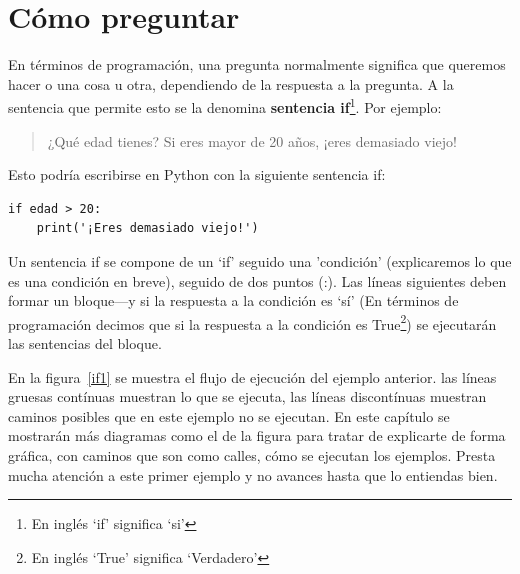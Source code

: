 

\chapter{Cómo preguntar}\label{ch:howtoaskaquestion}

En términos de programación, una pregunta normalmente significa que queremos hacer o una cosa u otra, dependiendo de la respuesta a la pregunta.  A la sentencia que permite esto se la denomina \textbf{sentencia if}\footnote{En inglés `if' significa `si'}.  Por ejemplo:

\begin{quotation}
¿Qué edad tienes?  Si eres mayor de 20 años, ¡eres demasiado viejo!
\end{quotation}

Esto podría escribirse en Python con la siguiente sentencia if:

\begin{listing}
\begin{verbatim}
if edad > 20:
    print('¡Eres demasiado viejo!')
\end{verbatim}
\end{listing}

Un sentencia if se compone de un `if' seguido una 'condición' (explicaremos lo que es una condición en breve), seguido de dos puntos (:).  Las líneas siguientes deben formar un bloque---y si la respuesta a la condición es `sí' (En términos de programación decimos que si la respuesta a la condición es True\footnote{En inglés `True' significa `Verdadero'}) se ejecutarán las sentencias del bloque.

En la figura~\ref{if1} se muestra el flujo de ejecución del ejemplo anterior. las líneas gruesas contínuas muestran lo que se ejecuta, las líneas discontínuas muestran caminos posibles que en este ejemplo no se ejecutan.  En este capítulo se mostrarán más diagramas como el de la figura para tratar de explicarte de forma gráfica, con caminos que son como calles, cómo se ejecutan los ejemplos. Presta mucha atención a este primer ejemplo y no avances hasta que lo entiendas bien.

